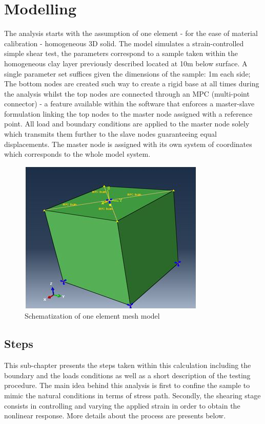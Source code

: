 \documentclass[12pt,a4paper]{report}
\begin{document}
\section{Modelling}

The analysis starts with the assumption of one element - for the ease of material calibration - homogeneous 3D solid. The model simulates a strain-controlled simple shear test, the parameters correspond to a sample taken within the homogeneous clay layer previously described located at 10m below surface. A single parameter set suffices given the dimensions of the sample: 1m each side; The bottom nodes are created such way to create a rigid base at all times during the analysis whilst the top nodes are connected through an MPC (multi-point connector) - a feature available within the software that enforces a master-slave formulation linking the top nodes to the master node assigned with a reference point. All load and boundary conditions are applied to the master node solely which transmits them further to the slave nodes guaranteeing equal displacements. The master node is assigned with its own system of coordinates which corresponds to the whole model system.

\begin{figure}[h!]
	\centering
	\includegraphics[width=0.7\linewidth]{"1dmodel"}
	\caption{Schematization of one element mesh model }
	\label{cube}
\end{figure}

\subsection{Steps}
This sub-chapter presents the steps taken within this calculation including the boundary and the loads conditions as well as a short description of the testing procedure. The main idea behind this analysis is first to confine the sample to mimic the natural conditions in terms of stress path. Secondly, the shearing stage consists in controlling and varying the applied strain in order to obtain the nonlinear response. More details about the process are presents below. 
\end{document}
